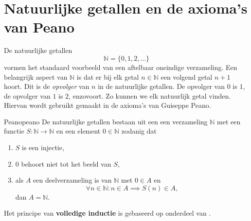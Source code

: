 \section{Natuurlijke getallen en de axioma's van Peano}
De natuurlijke getallen
\[
    \mathbb{N} = \{0,1,2, \ldots\}
\] vormen het standaard voorbeeld van een aftelbaar oneindige verzameling.
Een belangrijk aspect van $\mathbb{N}$ is dat er bij elk getal $n \in \mathbb{N}$ een volgend getal $n + 1$ hoort.
Dit is de \emph{opvolger} van $n$ in de natuurlijke getallen.
De opvolger van $0$ is $1$, de opvolger van $1$ is $2$, enzovoort.
Zo kunnen we elk natuurlijk getal vinden.
Hiervan wordt gebruikt gemaakt in de axioma's van Guiseppe Peano.

\begin{axioma}{Peano}{peano}
    De natuurlijke getallen bestaan uit een een verzameling $\mathbb{N}$ met een functie $S: \mathbb{N} \to \mathbb{N}$ en een element $0 \in \mathbb{N}$ zodanig dat
    \begin{enumerate}[label = (\alph*)]
        \item $S$ is een injectie,\label{item:peano-I}
        \item $0$ behoort niet tot het beeld van $S$,\label{item:peano-II}
        \item als $A$ een deelverzameling is van $\mathbb{N}$ met $0 \in A$ en
            \[
                \forall n \in \mathbb{N}: n \in A \implies S(n) \in A,
            \] dan $A = \mathbb{N}$.\label{item:peano-III}
    \end{enumerate}
\end{axioma}
Het principe van \textbf{volledige inductie} is gebaseerd op onderdeel  van .

